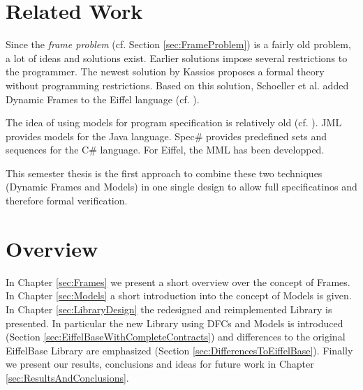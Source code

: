 \section{Related Work}
\label{sec:RelatedWork}

Since the \emph{frame problem} (cf. Section \ref{sec:FrameProblem}) is a fairly old problem, a lot of ideas and solutions exist. Earlier solutions \cite{Mueller01Modular, Leino02Data, Leino04Object} impose several restrictions to the programmer. The newest solution by Kassios \cite{Kassios06Dynamic} proposes a formal theory without programming restrictions. Based on this solution, Schoeller et al. added Dynamic Frames to the Eiffel language (cf. \cite{SchoellerDynamic, Schoeller06Eiffel0}).

The idea of using models for program specification is relatively old (cf. \cite{Hoare72Proof}). JML \cite{Leavens98Preliminary} provides models for the Java language. Spec\# \cite{Barnett04The} provides predefined sets and sequences for the C\# language. For Eiffel, the MML \cite{Widmer04Reusable, Schoeller03Strengthening, Schoeller06Making} has been developped.

This semester thesis is the first approach to combine these two techniques (Dynamic Frames and Models) in one single design to allow full specificatinos and therefore formal verification.

\section{Overview}
\label{sec:Overview}

In Chapter \ref{sec:Frames} we present a short overview over the concept of Frames. In Chapter \ref{sec:Models} a short introduction into the concept of Models is given. In Chapter \ref{sec:LibraryDesign} the redesigned and reimplemented Library is presented. In particular the new Library using DFCs and Models is introduced (Section \ref{sec:EiffelBaseWithCompleteContracts}) and differences to the original EiffelBase Library are emphasized (Section \ref{sec:DifferencesToEiffelBase}). Finally we present our results, conclusions and ideas for future work in Chapter \ref{sec:ResultsAndConclusions}.
